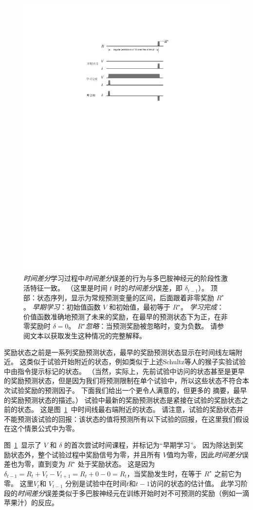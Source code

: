 \begin{figure}[!htb]
	\centering
	\includegraphics[width=0.5\linewidth]{chap12/fig_12_5}
	\caption{\textit{时间差分}学习过程中\textit{时间差分}误差的行为与多巴胺神经元的阶段性激活特征一致。
		（这里是时间 $t$ 时的\textit{时间差分}误差，即 $\delta_{t-1}$）。
		顶部：状态序列，显示为常规预测变量的区间，后面跟着非零奖励 $R^{\star}$。
		\textit{早期学习}：初始值函数 $V$ 和初始值，最初等于 $R^{\star}$。
		\textit{学习完成}：价值函数准确地预测了未来的奖励，在最早的预测状态下为正，在非零奖励时 $\delta = 0$。
		\textit{$R^{\star}$忽略}：当预测奖励被忽略时，变为负数。
		请参阅文本以获取发生这种情况的完整解释。
		\label{fig:12_5}}
\end{figure}


奖励状态之前是一系列奖励预测状态，最早的奖励预测状态显示在时间线左端附近。
这类似于试验开始附近的状态，例如类似于上述Schultz等人\cite{schultz1993responses}的猴子实验试验中由指令提示标记的状态。
（当然，实际上，先前试验中访问的状态甚至是更早的奖励预测状态，但是因为我们将预测限制在单个试验中，所以这些状态不符合本次试验奖励的预测因子。
下面我们给出一个更令人满意的，但更多的 摘要，最早的奖励预测状态的描述。）
试验中最新的奖励预测状态是紧接在试验的奖励状态之前的状态。
这是图~\ref{fig:12_5}~中时间线最右端附近的状态。
请注意，试验的奖励状态并不能预测该试验的回报：该状态的值将预测所有以下试验的回报，在这里我们假设在这个情景公式中为零。


图~\ref{fig:12_5}~显示了 $V$ 和 $\delta$ 的首次尝试时间课程，并标记为“早期学习”。 
因为除达到奖励状态外，整个试验过程中奖励信号为零，并且所有 $V$值均为零，因此\textit{时间差分}误差也为零，直到变为 $R^{\star}$ 处于奖励状态。
这是因为 $\delta_{t-1} = R_t + V_t - V_{t+1} = R_t + 0 - 0 = R_t$，当奖励发生时，在等于 $R^{\star}$ 之前它为零。
这里$V_t$和 $V_{t-1}$ 分别是试验中在时间$t$和$t-1$访问的状态的估计值。
此学习阶段的\textit{时间差分}误差类似于多巴胺神经元在训练开始时对不可预测的奖励（例如一滴苹果汁）的反应。



